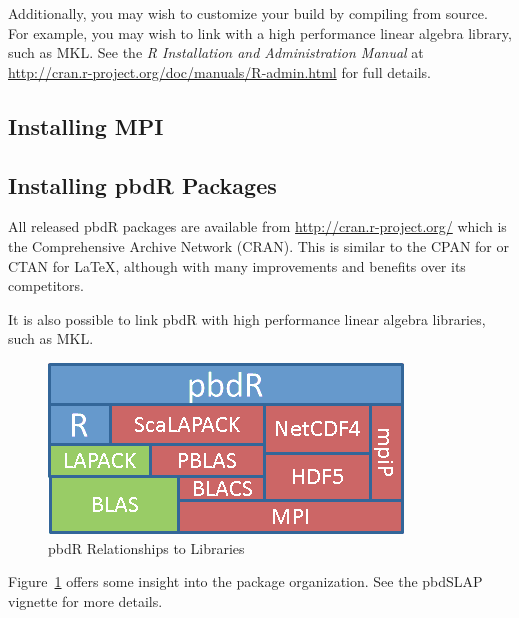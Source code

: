 Additionally, you may wish to customize your  build by compiling from source.  For example, you may wish to link  with a high performance linear algebra library, such as MKL.  See the \emph{R Installation and Administration Manual} at \url{http://cran.r-project.org/doc/manuals/R-admin.html} for full details.  


\subsection{Installing MPI}
  



\subsection{Installing pbdR Packages}
All released pbdR packages are available from \url{http://cran.r-project.org/} which is the Comprehensive  Archive Network (CRAN).  This is similar to the CPAN for  or CTAN for \LaTeX, although with many improvements and benefits over its competitors.

It is also possible to link pbdR with high performance linear algebra libraries, such as MKL.
\begin{figure}[h]
\centering
\includegraphics[scale=.7]{_all/pics/libs.png}
\caption{pbdR Relationships to Libraries}\label{fig:pbd}
\end{figure}
Figure~\ref{fig:pbd} offers some insight into the package organization.  See the pbdSLAP vignette for more details.
